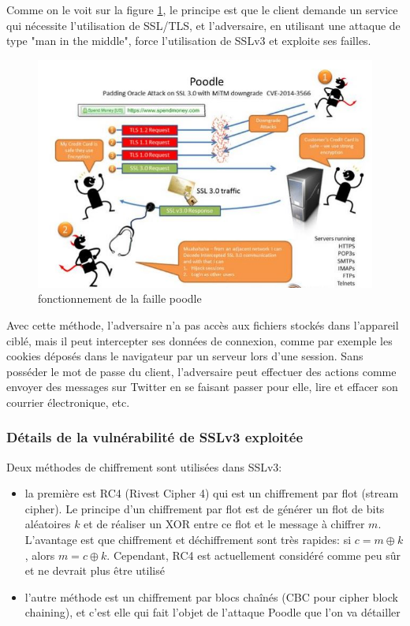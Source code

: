 Comme on le voit sur la figure \ref{poodle}, le principe est que le client demande un service qui nécessite l'utilisation de SSL/TLS, et l'adversaire, en utilisant une attaque de type "man in the middle", force l'utilisation de SSLv3 et exploite ses failles.

\begin{figure}[H]
\includegraphics[scale=0.8]{img/poodle.jpg}
\caption{fonctionnement de la faille poodle}
\label{poodle}
\end{figure}

Avec cette méthode, l'adversaire n’a pas accès aux fichiers stockés dans l’appareil ciblé, mais il peut intercepter ses données de connexion, comme par exemple les cookies déposés dans le navigateur par un serveur lors d’une session. Sans posséder le mot de passe du client, l'adversaire peut effectuer des actions comme envoyer des messages sur Twitter en se faisant passer pour elle, lire et effacer son courrier électronique, etc.

\subsubsection{Détails de la vulnérabilité de SSLv3 exploitée}

Deux méthodes de chiffrement sont utilisées dans SSLv3:
\begin{itemize}
\item la première est RC4 (Rivest Cipher 4) qui est un chiffrement par flot (stream cipher). Le principe d'un chiffrement par flot est de générer un flot de bits aléatoires $k$ et de réaliser un XOR entre ce flot et le message à chiffrer $m$. L'avantage est que chiffrement et déchiffrement sont très rapides: si $c = m \oplus k$, alors $m = c \oplus k$. Cependant, RC4 est actuellement considéré comme peu s\^ur et ne devrait plus \^etre utilisé
\item l'autre méthode est un chiffrement par blocs cha\^inés (CBC pour cipher block chaining), et c'est elle qui fait l'objet de l'attaque Poodle que l'on va détailler
\end{itemize}

